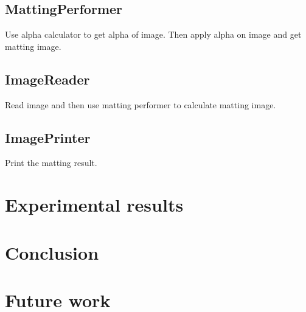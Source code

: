 \documentclass[11pt,letterpaper]{article}
\begin{document}
\subsection{MattingPerformer}
Use alpha calculator to get alpha of image. Then apply alpha on image and get matting image.
\subsection{ImageReader}
Read image and then use matting performer to calculate matting image.
\subsection{ImagePrinter}
Print the matting result.

\section{Experimental results}
\section{Conclusion}
\section{Future work}


\end{document}
